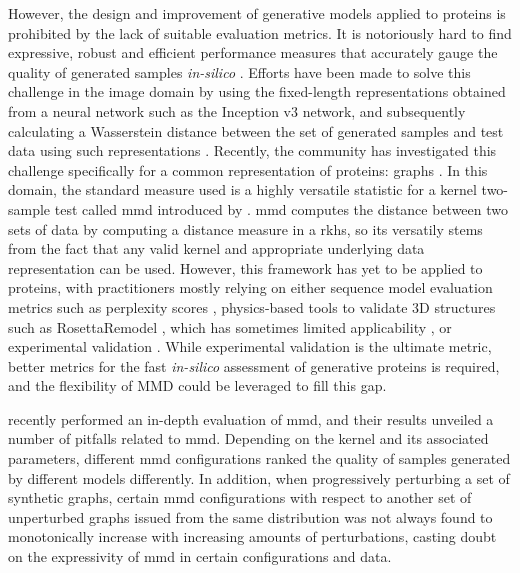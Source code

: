 However, the design and improvement of generative models applied to proteins is
prohibited by the lack of suitable evaluation metrics. It is notoriously hard to
find expressive, robust and efficient performance measures that accurately gauge
the quality of generated samples \emph{in-silico} \citep{theis2016note,
betzalel2022study}. Efforts have been made to solve this challenge in the image
domain by using the fixed-length representations obtained from a neural network
such as the Inception v3 network, and subsequently calculating a Wasserstein
distance between the set of generated samples and test data using such
representations \citep{heusel2017gans}. Recently, the community has investigated
this challenge specifically for a common representation of proteins: graphs
\citep{thompson2022evaluation, obray2022evaluation}. In this domain, the
standard measure used is a highly versatile statistic for a kernel two-sample
test called \acrfull{mmd} introduced by \cite{gretton2012kernel}. \acrshort{mmd}
computes the distance between two sets of data by computing a distance measure
in a \acrfull{rkhs}, so its versatily stems from the fact that any valid kernel
and appropriate underlying data representation can be used. However, this
framework has yet to be applied to proteins, with practitioners mostly relying
on either sequence model evaluation metrics such as perplexity scores
\citep{belinkov2019analysis,ingraham2019generative,hesslow2022rita},
physics-based tools to validate 3D structures such as RosettaRemodel
\citep{huang2011rosettaremodel, anand2018generative,ingraham2019generative},
which has sometimes limited applicability \citep{leman2020macromolecular}, or
experimental validation \citep{strokach2020fast}. While experimental validation
is the ultimate metric, better metrics for the fast \emph{in-silico} assessment
of generative proteins is required, and the flexibility of MMD could be
leveraged to fill this gap.

\cite{obray2022evaluation} recently performed an in-depth evaluation of
\acrshort{mmd}, and their results unveiled a number of pitfalls related to
\acrshort{mmd}. Depending on the kernel and its associated parameters,
different \acrshort{mmd} configurations ranked the quality of samples generated
by different models differently. In addition, when progressively perturbing a
set of synthetic graphs, certain \acrshort{mmd} configurations with respect to
another set of unperturbed graphs issued from the same distribution was not
always found to monotonically increase with increasing amounts of perturbations,
casting doubt on the expressivity of \acrshort{mmd} in certain configurations
and data.

